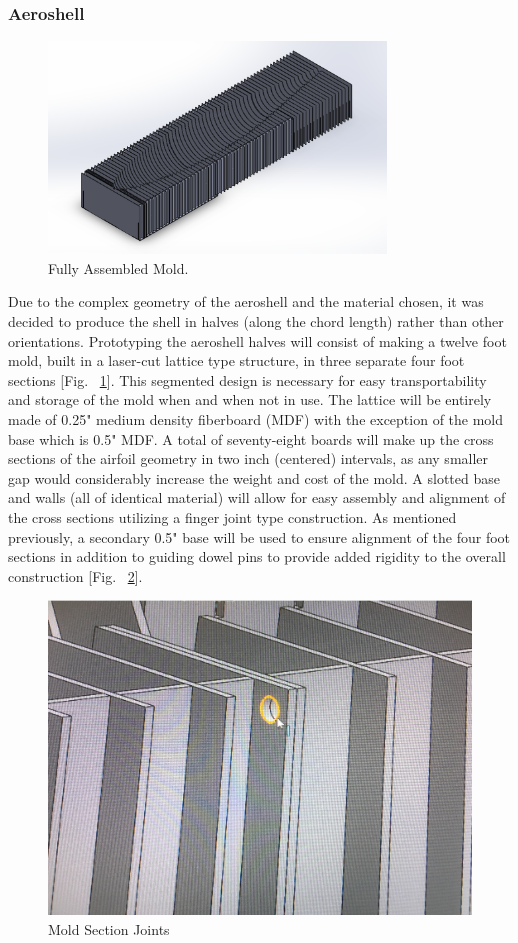\subsubsection{Aeroshell}

\begin{figure}[ht]
\centering
\includegraphics[width=0.8\textwidth]{Aeroshell/completedMold.PNG}
\caption{\label{fig:completedMold} Fully Assembled Mold.}
\end{figure}


\indent\indent Due to the complex geometry of the aeroshell and the material chosen, it was decided to produce the shell in halves (along the chord length) rather than other orientations. Prototyping the aeroshell halves will consist of making a twelve foot mold, built in a laser-cut lattice type structure, in three separate four foot sections [Fig. ~\ref{fig:completedMold}]. This segmented design is necessary for easy transportability and storage of the mold when and when not in use. The lattice will be entirely made of 0.25" medium density fiberboard (MDF) with the exception of the mold base which is 0.5" MDF. A total of seventy-eight boards will make up the cross sections of the airfoil geometry in two inch (centered) intervals, as any smaller gap would considerably increase the weight and cost of the mold. A slotted base and walls (all of identical material) will allow for easy assembly and alignment of the cross sections utilizing a finger joint type construction. As mentioned previously, a secondary 0.5" base will be used to ensure alignment of the four foot sections in addition to guiding dowel pins to provide added rigidity to the overall construction [Fig. ~\ref{fig:Section_Joint}].

\begin{figure}[H]
  \centering
  \includegraphics[width=.3\textwidth]{Figures/Section_Joint.PNG}
  \caption{\label{fig:Section_Joint} Mold Section Joints}
\end{figure}

